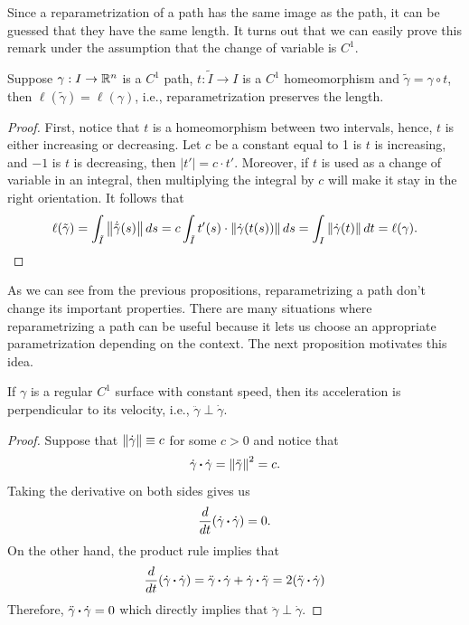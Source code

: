 Since a reparametrization of a path has the same image as the path, it can be guessed that they have the same length. It turns out that we can easily prove this remark under the assumption that the change of variable is $C^1$.

\begin{proposition}
    Suppose $\gamma : I \to \mathbb{R}^n$ is a $C^1$ path, $t :\tilde{I} \to I$ is a $C^1$ homeomorphism and $\tilde{\gamma} = \gamma \circ t$, then $\ell(\tilde{\gamma}) = \ell(\gamma)$, i.e., reparametrization preserves the length.
\end{proposition}

\begin{proof}
    First, notice that $t$ is a homeomorphism between two intervals, hence, $t$ is either increasing or decreasing. Let $c$ be a constant equal to 1 is $t$ is increasing, and $-1$ is $t$ is decreasing, then $|t'| = c\cdot t'$. Moreover, if $t$ is used as a change of variable in an integral, then multiplying the integral by $c$ will make it stay in the right orientation. It follows that 
    $$\ell(\tilde{\gamma}) = \int_{\tilde{I}}\left\lVert\dot{\tilde{\gamma}}(s) \right\rVert ds = c\int_{\tilde{I}}t'(s)\cdot \left\lVert\dot{\gamma}(t(s)) \right\rVert ds = \int_I\left\lVert\dot{\gamma}(t) \right\rVert dt = \ell(\gamma).$$
\end{proof}

As we can see from the previous propositions, reparametrizing a path don't change its important properties. There are many situations where reparametrizing a path can be useful because it lets us choose an appropriate parametrization depending on the context. The next proposition motivates this idea.

\begin{proposition}
    If $\gamma$ is a regular $C^1$ surface with constant speed, then its acceleration is perpendicular to its velocity, i.e., $\ddot{\gamma}\perp \dot{\gamma}$.
\end{proposition}

\begin{proof}
    Suppose that $\left\lVert\dot{\gamma} \right\rVert \equiv c$ for some $c > 0$ and notice that
    $$\dot{\gamma}\operatorname{\boldsymbol{\cdot}}\dot{\gamma} = \left\lVert\ddot{\gamma} \right\rVert^2 = c.$$
    Taking the derivative on both sides gives us
    $$\frac{d}{dt}(\dot{\gamma}\operatorname{\boldsymbol{\cdot}}\dot{\gamma}) = 0.$$
    On the other hand, the product rule implies that
    $$\frac{d}{dt}(\dot{\gamma}\operatorname{\boldsymbol{\cdot}}\dot{\gamma}) = \ddot{\gamma}\operatorname{\boldsymbol{\cdot}}\dot{\gamma} + \dot{\gamma}\operatorname{\boldsymbol{\cdot}}\ddot{\gamma} = 2(\ddot{\gamma}\operatorname{\boldsymbol{\cdot}}\dot{\gamma})$$
    Therefore, $\ddot{\gamma}\operatorname{\boldsymbol{\cdot}}\dot{\gamma} = 0$ which directly implies that $\ddot{\gamma}\perp\dot{\gamma}$.
\end{proof}

